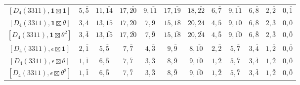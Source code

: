 \begin{table}[ht]
\begin{adjustbox}{max width=\linewidth}
\begin{tabular}{|c|ccccccccccc|}
        $[D_4(3311), \mathbf{1}\boxtimes\mathbf{1}]$ & $5, \bar{5}$ & $11, \bar{14}$ & $17, \bar{20}$ & $9, \bar{11}$ & $17, \bar{19}$ & $18, \bar{22}$ & $6, \bar{7}$ & $9, \bar{11}$ & $6, \bar{8}$ & $2, \bar{2}$ & $0, \bar{1}$ \\ 
        $[D_4(3311), \mathbf{1}\boxtimes\theta]$ & $3, \bar{4}$ & $13, \bar{15}$ & $17, \bar{20}$ & $7, \bar{9}$ & $15, \bar{18}$ & $20, \bar{24}$ & $4, \bar{5}$ & $9, \bar{10}$ & $6, \bar{8}$ & $2, \bar{3}$ & $0, \bar{0}$ \\ 
        $[D_4(3311), \mathbf{1}\boxtimes\theta^2]$ & $3, \bar{4}$ & $13, \bar{15}$ & $17, \bar{20}$ & $7, \bar{9}$ & $15, \bar{18}$ & $20, \bar{24}$ & $4, \bar{5}$ & $9, \bar{10}$ & $6, \bar{8}$ & $2, \bar{3}$ & $0, \bar{0}$ \\ 
        $[D_4(3311), \epsilon\boxtimes\mathbf{1}]$ & $2, \bar{1}$ & $5, \bar{5}$ & $7, \bar{7}$ & $4, \bar{3}$ & $9, \bar{9}$ & $8, \bar{10}$ & $2, \bar{2}$ & $5, \bar{7}$ & $3, \bar{4}$ & $1, \bar{2}$ & $0, \bar{0}$ \\
        $[D_4(3311), \epsilon\boxtimes\theta]$ & $1, \bar{1}$ & $6, \bar{5}$ & $7, \bar{7}$ & $3, \bar{3}$ & $8, \bar{9}$ & $9, \bar{10}$ & $1, \bar{2}$ & $5, \bar{7}$ & $3, \bar{4}$ & $1, \bar{2}$ & $0, \bar{0}$ \\ 
        $[D_4(3311), \epsilon\boxtimes\theta^2]$ & $1, \bar{1}$ & $6, \bar{5}$ & $7, \bar{7}$ & $3, \bar{3}$ & $8, \bar{9}$ & $9, \bar{10}$ & $1, \bar{2}$ & $5, \bar{7}$ & $3, \bar{4}$ & $1, \bar{2}$ & $0, \bar{0}$ \\ \hline

        \end{tabular}
    \end{adjustbox}
    \end{table}

    \newpage
    
    \vspace{1cm}

